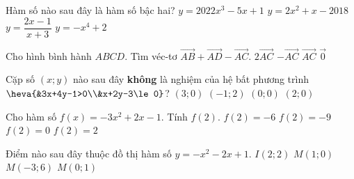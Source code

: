 \begin{ex}%
Hàm số nào sau đây là hàm số bậc hai?
\choice
{$y=2022x^3-5x+1$}
{\True $y=2x^2+x-2018$}
{$y=\dfrac{2x-1}{x+3}$}
{$y=-x^4+2$}
\end{ex}
%
\begin{ex}%
Cho hình bình hành $ABCD$. Tìm véc-tơ $\overrightarrow{AB}+\overrightarrow{AD}-\overrightarrow{AC}$.
\choice
{$2\overrightarrow{AC}$}
{$-\overrightarrow{AC}$}
{$\overrightarrow{AC}$}
{\True $\overrightarrow{0}$}
\end{ex}
\begin{ex}%
Cặp số $(x;y)$ nào sau đây \textbf{không} là nghiệm của hệ bất phương trình $\heva{&3x+4y-1>0\\&x+2y-3\le 0}$?
\choice
{$(3;0)$}
{$(-1;2)$}
{\True $(0;0)$}
{$(2;0)$}
\end{ex}
\begin{ex}%
Cho hàm số $f(x)=-3 x^2+2x-1$. Tính $f(2)$.
\choice
{$f(2)=-6$}
{\True $f(2)=-9$}
{$f(2)=0$}
{$f(2)=2$}
\end{ex}
\begin{ex}%
Điểm nào sau đây thuộc đồ thị hàm số $y=-x^2-2x+1$.
\choice
{$I(2;2)$}
{$M(1;0)$}
{$M(-3;6)$}
{\True $M(0;1)$}
\end{ex}



